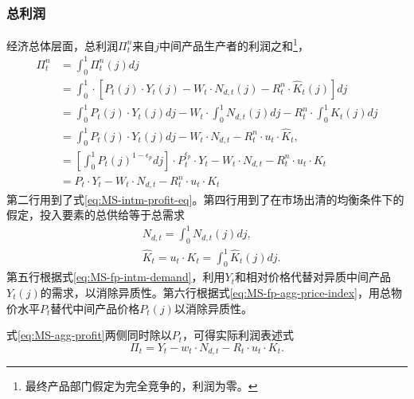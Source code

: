 \subsubsection{总利润}
经济总体层面，总利润$\Pi_t^n$来自$j$中间产品生产者的利润之和\footnote{最终产品部门假定为完全竞争的，利润为零。}，
\begin{equation}
\label{eq:MS-agg-profit}
\begin{split}
\Pi^n_t &= \int_{0}^1 \Pi^n_t(j) dj \\
&= \int_{0}^1 \cdot \left[
P_t(j) \cdot Y_t(j) - W_t \cdot N_{d,t}(j) - R^n_t \cdot \hat{K}_t(j)
\right] dj \\
&= \int_0^1 P_t(j) \cdot Y_t(j) dj - W_t \cdot \int_0^1 N_{d,t}(j) dj - R^n_t \cdot \int_{0}^{1}\hat{K}_{t}(j) dj\\
&= \int_0^1 P_t(j) \cdot Y_t(j) dj - W_t \cdot N_{d,t} - R^n_t \cdot u_t \cdot \hat{K}_t,\\
&= \left[\int_0^1 P_t(j)^{1-\epsilon_p} dj \right] \cdot P_t^{\epsilon_p} \cdot Y_t - W_t \cdot N_{d,t} - R^n_t \cdot u_t \cdot K_t \\
&= P_t\cdot Y_t - W_t \cdot N_{d,t} - R^n_t \cdot u_t \cdot K_t
\end{split}
\end{equation}
第二行用到了式\eqref{eq:MS-intm-profit-eq}。第四行用到了在市场出清的均衡条件下的假定，投入要素的总供给等于总需求
\begin{align}
\label{eq:MS-mkt-clearing-Ndt}
&N_{d,t} = \int_{0}^{1} N_{d,t}(j) dj, \\
\label{eq:MS-mkt-clearing-hatKdt}
&\hat{K}_t = u_t \cdot K_t = \int_{0}^1 \hat{K}_{t}(j) dj.
\end{align}
第五行根据式\eqref{eq:MS-fp-intm-demand}，利用$Y_t$和相对价格代替对异质中间产品$Y_t(j)$的需求，以消除异质性。第六行根据式\eqref{eq:MS-fp-agg-price-index}，用总物价水平$P_t$替代中间产品价格$P_t(j)$以消除异质性。

式\eqref{eq:MS-agg-profit}两侧同时除以$P_t$，可得实际利润表述式
\begin{equation}
\label{eq:MS-agg-profit-real}
\Pi_t = Y_t - w_t \cdot N_{d,t} - R_t \cdot u_t \cdot K_t.
\end{equation}


